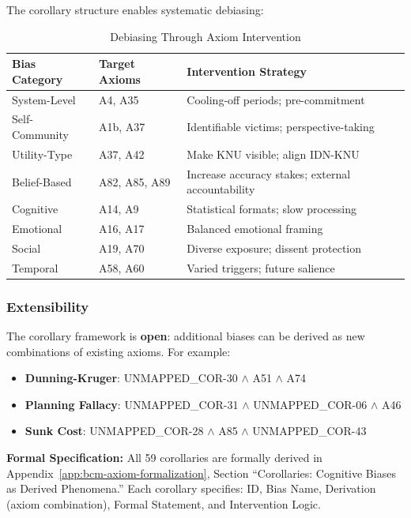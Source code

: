 The corollary structure enables systematic debiasing:

\begin{table}[htbp]
\centering
\caption{Debiasing Through Axiom Intervention}
\label{tab:debiasing-axiom}
\renewcommand{\arraystretch}{1.3}
\begin{tabular}{@{}lll@{}}
\toprule
\textbf{Bias Category} & \textbf{Target Axioms} & \textbf{Intervention Strategy} \\
\midrule
System-Level & A4, A35 & Cooling-off periods; pre-commitment \\
Self-Community & A1b, A37 & Identifiable victims; perspective-taking \\
Utility-Type & A37, A42 & Make KNU visible; align IDN-KNU \\
Belief-Based & A82, A85, A89 & Increase accuracy stakes; external accountability \\
Cognitive & A14, A9 & Statistical formats; slow processing \\
Emotional & A16, A17 & Balanced emotional framing \\
Social & A19, A70 & Diverse exposure; dissent protection \\
Temporal & A58, A60 & Varied triggers; future salience \\
\bottomrule
\end{tabular}
\end{table}

\subsubsection{Extensibility}

The corollary framework is \textbf{open}: additional biases can be derived as new combinations of existing axioms. For example:

\begin{itemize}
\item \textbf{Dunning-Kruger}: UNMAPPED_COR-30 $\land$ A51 $\land$ A74
\item \textbf{Planning Fallacy}: UNMAPPED_COR-31 $\land$ UNMAPPED_COR-06 $\land$ A46
\item \textbf{Sunk Cost}: UNMAPPED_COR-28 $\land$ A85 $\land$ UNMAPPED_COR-43
\end{itemize}

\begin{cross-reference}
\textbf{Formal Specification:} All 59 corollaries are formally derived in Appendix~\ref{app:bcm-axiom-formalization}, Section ``Corollaries: Cognitive Biases as Derived Phenomena.'' Each corollary specifies: ID, Bias Name, Derivation (axiom combination), Formal Statement, and Intervention Logic.
\end{cross-reference}

